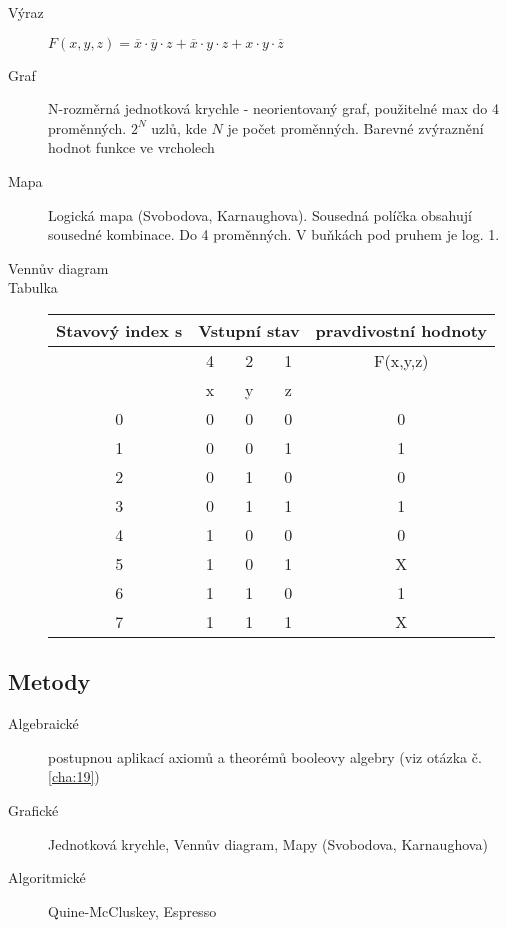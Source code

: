 \documentclass[a4wide]{report}
\begin{document}
\begin{description}
	\item[Výraz] 
		$ F(x,y,z) = \overline{x} \cdot \overline{y} \cdot z + \overline{x} \cdot y \cdot z + x \cdot y \cdot \overline{z}$
	\item[Graf] N-rozměrná jednotková krychle - neorientovaný graf, použitelné max do 4 proměnných. $2^N$ uzlů, kde $N$ je počet proměnných. Barevné zvýraznění hodnot funkce ve vrcholech
	\item[Mapa] Logická mapa (Svobodova, Karnaughova). Sousedná políčka obsahují sousedné kombinace. Do 4 proměnných. V buňkách pod pruhem je log. 1.
	\item[Vennův diagram]
	\item[Tabulka]
		\begin{tabular}{| c | c | c | c | c | }
			\hline
			\multirow{3}{*}{Stavový index s}	& \multicolumn{3}{|c|}{Vstupní stav} & pravdivostní hodnoty \\ \hline
				& 4 & 2 & 1 & F(x,y,z) \\ \hline
				& x & y & z & 	\\ \hline
			0   & 0 & 0 & 0 & 0 \\ \hline
			1   & 0 & 0 & 1 & 1 \\ \hline
			2   & 0 & 1 & 0 & 0 \\ \hline
			3   & 0 & 1 & 1 & 1 \\ \hline
			4   & 1 & 0 & 0 & 0 \\ \hline
			5   & 1 & 0 & 1 & X \\ \hline
			6   & 1 & 1 & 0 & 1 \\ \hline
			7   & 1 & 1 & 1 & X \\ \hline
		\end{tabular}
		
\end{description}

\subsection{Metody}

\begin{description}
	\item[Algebraické] postupnou aplikací axiomů a theorémů booleovy algebry (viz otázka č. \ref{cha:19})
	\item[Grafické] Jednotková krychle, Vennův diagram, Mapy (Svobodova, Karnaughova)
	\item[Algoritmické] Quine-McCluskey, Espresso
\end{description}
\end{document}
